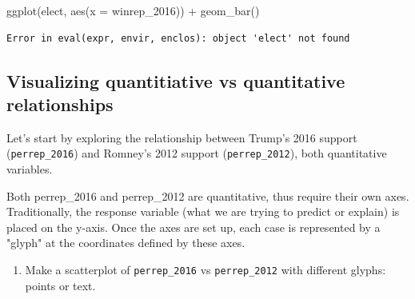 \documentclass[
  letterpaper,
  DIV=11,
  numbers=noendperiod]{scrreprt}
\newenvironment{Shaded}{\begin{snugshade}}{\end{snugshade}}
\newcommand{\AttributeTok}[1]{\textcolor[rgb]{0.40,0.45,0.13}{#1}}
\newcommand{\FunctionTok}[1]{\textcolor[rgb]{0.28,0.35,0.67}{#1}}
\newcommand{\NormalTok}[1]{\textcolor[rgb]{0.00,0.23,0.31}{#1}}
\newcommand{\SpecialCharTok}[1]{\textcolor[rgb]{0.37,0.37,0.37}{#1}}
\providecommand{\tightlist}{%
  \setlength{\itemsep}{0pt}\setlength{\parskip}{0pt}}\usepackage{longtable,booktabs,array}
\begin{document}
\begin{Shaded}
\begin{Highlighting}[]
\FunctionTok{ggplot}\NormalTok{(elect, }\FunctionTok{aes}\NormalTok{(}\AttributeTok{x =}\NormalTok{ winrep\_2016)) }\SpecialCharTok{+}
  \FunctionTok{geom\_bar}\NormalTok{()}
\end{Highlighting}
\end{Shaded}

\begin{verbatim}
Error in eval(expr, envir, enclos): object 'elect' not found
\end{verbatim}

\subsection*{Visualizing quantitiative vs quantitative
relationships}\label{visualizing-quantitiative-vs-quantitative-relationships}

Let's start by exploring the relationship between Trump's 2016 support
(\texttt{perrep\_2016}) and Romney's 2012 support
(\texttt{perrep\_2012}), both quantitative variables.

\begin{Shaded}
\begin{Highlighting}[]
\NormalTok{Both \textasciigrave{}perrep\_2016\textasciigrave{} and \textasciigrave{}perrep\_2012\textasciigrave{} are quantitative, thus require their own axes.  Traditionally, the response variable (what we are trying to predict or explain) is placed on the y{-}axis.  Once the axes are set up, each case is represented by a "glyph" at the coordinates defined by these axes.    }
\end{Highlighting}
\end{Shaded}

\begin{enumerate}
\def\labelenumi{\alph{enumi}.}
\tightlist
\item
  Make a scatterplot of \texttt{perrep\_2016} vs \texttt{perrep\_2012}
  with different glyphs: points or text.
\end{enumerate}
\end{document}
